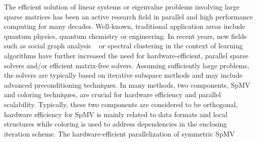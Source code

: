 The efficient solution of linear systems or eigenvalue problems
involving large sparse matrices has been an active research field in
parallel and high performance computing for many decades. Well-known,
traditional application areas include quantum physics, quantum
chemistry or engineering. In recent years, new fields such as social
graph analysis ~\cite{Simpson:2018:BGP:3218176.3218232} or spectral
clustering in the context of learning
algorithms \cite{vonLuxburg2007,JMLR:v17:16-109} have further
increased the need for hardware-efficient, parallel sparse solvers
and/or efficient matrix-free solvers. Assuming sufficiently large
problems, the solvers are typically based on iterative subspace
methods and may include advanced preconditioning techniques. In many
methods, two components, \acrfull{SpMV} and coloring techniques, are
crucial for hardware efficiency and parallel scalability. Typically,
these two components are considered to be orthogonal, \ie hardware
efficiency for \Acrshort{SpMV} is mainly related to data formats and
local structures while coloring is used to address dependencies in the
enclosing iteration scheme.   The hardware-efficient
parallelization of symmetric \Acrshort{SpMV}  

